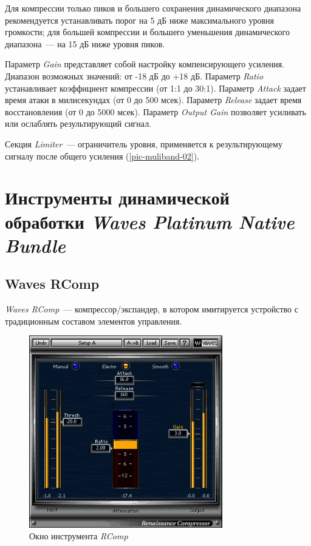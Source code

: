 \documentclass[oneside, final, 14pt]{extreport}
\begin{document}
Для компрессии только пиков и большего сохранения динамического диапазона рекомендуется устанавливать порог на 5 дБ ниже максимального уровня громкости; для большей компрессии и большего уменьшения динамического диапазона~--- на 15 дБ ниже уровня пиков.

Параметр \emph{Gain} представляет собой настройку компенсирующего усиления. Диапазон возможных значений: от -18 дБ до +18 дБ. Параметр \emph{Ratio} устанавливает коэффициент компрессии (от 1:1 до 30:1). Параметр \emph{Attack} задает время атаки в милисекундах (от 0 до 500 мсек). Параметр \emph{Release} задает время восстановления (от 0 до 5000 мсек). Параметр \emph{Output Gain} позволяет усиливать или ослаблять результирующий сигнал.

Секция \emph{Limiter}~--- ограничитель уровня, применяется к результирующему сигналу после общего усиления (\ref{pic-muliband-02}).

\section{Инструменты динамической обработки \emph{Waves Platinum Native Bundle}}
\subsection{Waves RComp}
\emph{Waves RComp}~--- компрессор/экспандер, в котором имитируется устройство с традиционным составом элементов управления. 

\begin{figure}[ht!]
  \centering
  \includegraphics[width=0.75\textwidth]{pic-wavescomp-01}
  \caption{Окно инструмента \emph{RComp}}
  \label{pic-wavescomp-01}
\end{figure}
\end{document}
